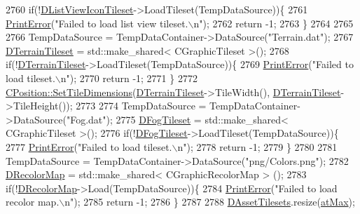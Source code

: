 \begin{DoxyCode}
2760     \textcolor{keywordflow}{if}(!\hyperlink{classCApplicationData_ab00db57ca7c624d026ed1fc108bc5b38}{DListViewIconTileset}->LoadTileset(TempDataSource))\{
2761         \hyperlink{Debug_8h_a2ed825eefefe35baf59a93a8c641323d}{PrintError}(\textcolor{stringliteral}{"Failed to load list view tileset.\(\backslash\)n"});
2762         \textcolor{keywordflow}{return} -1;
2763     \}
2764     
2765     
2766     TempDataSource = TempDataContainer->DataSource(\textcolor{stringliteral}{"Terrain.dat"});
2767     \hyperlink{classCApplicationData_acd9fb0d0ea35a6d93e8ec9212db8ef83}{DTerrainTileset} = std::make\_shared< CGraphicTileset >();
2768     \textcolor{keywordflow}{if}(!\hyperlink{classCApplicationData_acd9fb0d0ea35a6d93e8ec9212db8ef83}{DTerrainTileset}->LoadTileset(TempDataSource))\{
2769         \hyperlink{Debug_8h_a2ed825eefefe35baf59a93a8c641323d}{PrintError}(\textcolor{stringliteral}{"Failed to load tileset.\(\backslash\)n"});
2770         \textcolor{keywordflow}{return} -1;
2771     \}
2772     \hyperlink{classCPosition_a506e9efd21e209e36533ba7e594be75f}{CPosition::SetTileDimensions}(\hyperlink{classCApplicationData_acd9fb0d0ea35a6d93e8ec9212db8ef83}{DTerrainTileset}->TileWidth(), 
      \hyperlink{classCApplicationData_acd9fb0d0ea35a6d93e8ec9212db8ef83}{DTerrainTileset}->TileHeight());
2773     
2774     TempDataSource = TempDataContainer->DataSource(\textcolor{stringliteral}{"Fog.dat"});
2775     \hyperlink{classCApplicationData_a9d9103087da6592c08b8d6c669665323}{DFogTileset} = std::make\_shared< CGraphicTileset >();
2776     \textcolor{keywordflow}{if}(!\hyperlink{classCApplicationData_a9d9103087da6592c08b8d6c669665323}{DFogTileset}->LoadTileset(TempDataSource))\{
2777         \hyperlink{Debug_8h_a2ed825eefefe35baf59a93a8c641323d}{PrintError}(\textcolor{stringliteral}{"Failed to load tileset.\(\backslash\)n"});
2778         \textcolor{keywordflow}{return} -1;
2779     \}
2780     
2781     TempDataSource = TempDataContainer->DataSource(\textcolor{stringliteral}{"png/Colors.png"});
2782     \hyperlink{classCApplicationData_afcbfb5d837afd5c117d91216d1988a53}{DRecolorMap} = std::make\_shared< CGraphicRecolorMap > ();
2783     \textcolor{keywordflow}{if}(!\hyperlink{classCApplicationData_afcbfb5d837afd5c117d91216d1988a53}{DRecolorMap}->Load(TempDataSource))\{
2784         \hyperlink{Debug_8h_a2ed825eefefe35baf59a93a8c641323d}{PrintError}(\textcolor{stringliteral}{"Failed to load recolor map.\(\backslash\)n"});
2785         \textcolor{keywordflow}{return} -1;
2786     \}
2787     
2788     \hyperlink{classCApplicationData_a1aaf56a300b30c5e2484a5359366d77a}{DAssetTilesets}.resize(\hyperlink{GameDataTypes_8h_a5600d4fc433b83300308921974477feca92fbf60b4e5c335160f915b6a1c17c05}{atMax});

\end{DoxyCode}
